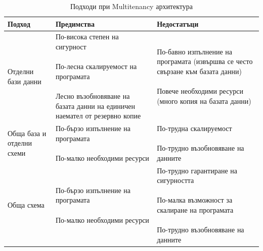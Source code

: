 \documentclass[pdftex,14pt,a4paper]{extreport}
\begin{document}
\begin{table}[h!]
  \begin{tabular}{|p{2.7cm}|p{5cm}|p{5cm}|}
    \hline
    Подход & Предимства & Недостатъци \\
    \hline
    Отделни бази данни &
    \parbox[t]{5cm}{
      По-висока степен на сигурност \\\\
      По-лесна скалируемост на програмата \\\\
      Лесно възобновяване на базата данни на единичен наемател от резервно копие
    } &
    \parbox[t]{5cm}{
      По-бавно изпълнение на програмата (извършва се често свързане към базата данни) \\\\
      Повече необходими ресурси (много копия на базата данни)
    }
    \\
    \hline
    Обща база и отделни схеми &
    \parbox[t]{5cm}{
      По-бързо изпълнение на програмата \\\\
      По-малко необходими ресурси
    }
    &
    \parbox[t]{5cm}{
      По-трудна скалируемост \\\\
      По-трудно възобновяване на данните
    }
    \\
    \hline
    Обща схема &
    \parbox[t]{5cm}{
     По-бързо изпълнение на програмата \\\\
     По-малко необходими ресурси
    }
    &
    \parbox[t]{5cm}{
      По-трудно гарантиране на сигурността \\\\
      По-малка възможност за скалиране на програмата \\\\
      По-трудно възобновяване на данните
    }
    \\
    \hline
  \end{tabular}
  \caption {Подходи при Multitenancy архитектура}
\end{table}
\end{document}
